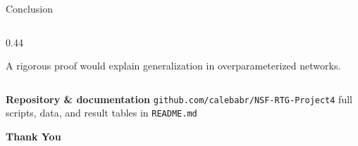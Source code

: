 \documentclass[aspectratio=169, 10pt]{beamer}
\begin{document}
\begin{frame}{Conclusion}
\begin{columns}[T]
\begin{column}{0.44\textwidth}
\begin{tcolorbox}[colback=aunavy!8, colframe=aunavy,
                        title={\small\textbf{Broader implication}},
                        top=2pt, bottom=2pt, left=4pt, right=4pt]
        \vspace{2pt}
        A rigorous proof would explain generalization
        in overparameterized networks.
      \end{tcolorbox}
    \end{column}
  \end{columns}
  \vspace{0.3em}
  \begin{tcolorbox}[colback=lightbg, colframe=mygray,
                    top=2pt, bottom=2pt, left=4pt, right=4pt,
                    boxsep=0pt]
    \centering\scriptsize
    \textbf{Repository \& documentation}\quad
    \texttt{github.com/calebabr/NSF-RTG-Project4}\quad
    {\color{mygray}full scripts, data, and result tables in \texttt{README.md}}
  \end{tcolorbox}
\end{frame}

\begin{frame}{}
  \begin{center}
    \vspace{2em}
    {\Huge\textbf{Thank You}}
  \end{center}
\end{frame}
\end{document}
